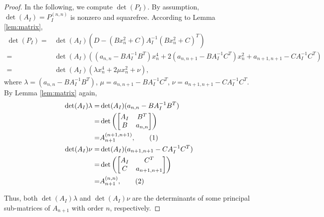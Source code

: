 \documentclass[amsthm]{elsart}
\newcommand\numberthis{\addtocounter{equation}{1}\tag{\theequation}}
\begin{document}
\begin{proof}
  In the following, we compute $\det(P_{I})$. By assumption, $\det(A_{I})=P_{I}^{(n,n)}$ is nonzero and squarefree. According to Lemma \ref{lem:matrix},
  \begin{align*}
    \det(P_{I})=&\det(A_{I})(D-(Bx_n^2+C)A_I^{-1}(Bx_n^2+C)^T)\\
    =&\det(A_{I})\left((a_{n,n}-BA_I^{-1}B^T)x_n^4+2(a_{n,n+1}- BA_I^{-1}C^T)x_n^2+a_{n+1,n+1}-CA_I^{-1}C^T\right)\\
    =&\det(A_I)(\lambda x_n^4+2\mu x_n^2+\nu),
  \end{align*}
  where $\lambda=(a_{n,n}-BA_I^{-1}B^T)$, $\mu=a_{n,n+1}-BA_I^{-1}C^T$, $\nu=a_{n+1,n+1}-CA_I^{-1}C^T$.
  By Lemma \ref{lem:matrix} again,
  \begin{align*}
    \det(A_I)\lambda=&\det(A_I)(a_{n,n}-BA_I^{-1}B^T)\\
    =&\det\left(\begin{bmatrix} A_I&B^T\\
        B&a_{n,n}\end{bmatrix}\right) \\
    =& A_{n+1}^{(n+1,n+1)},\numberthis \label{eq:1} \\
    \det(A_I)\nu=&\det(A_I)(a_{n+1,n+1}-CA_I^{-1}C^T)\\
    =&\det\left(\begin{bmatrix} A_I&C^T\\
        C&a_{n+1,n+1}\end{bmatrix}\right)\\
    =& A_{n+1}^{(n,n)}, \numberthis \label{eq:2}
  \end{align*}

  Thus, both $\det(A_I)\lambda$ and $\det(A_I)\nu$ are the determinants of some principal sub-matrices of $A_{n+1}$ with order $n$, respectively.



\end{proof}
\end{document}
